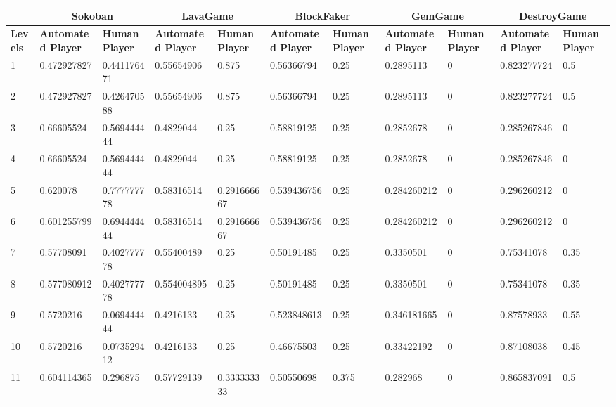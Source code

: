 \begin{landscape}
\begin{table}[!ht]
	\centering
	\begin{tabular}{|p{0.5in}|p{0.75in}|p{0.75in}|p{0.75in}|p{0.75in}|p{0.75in}|p{0.75in}|p{0.75in}|p{0.75in}|p{0.75in}|p{0.75in}|}
		\hline
		 & \multicolumn{2}{c}{\textbf{Sokoban}} & \multicolumn{2}{c}{\textbf{LavaGame}} & \multicolumn{2}{c}{\textbf{\textbf{BlockFaker}}} & \multicolumn{2}{c}{\textbf{GemGame}} & \multicolumn{2}{c}{\textbf{DestroyGame}}\\
		\hline
		\textbf{Levels} & \textbf{Automated Player} & \textbf{Human Player} & \textbf{Automated Player} & \textbf{Human Player} & \textbf{Automated Player} & \textbf{Human Player} & \textbf{Automated Player} & \textbf{Human Player} & \textbf{Automated Player} & \textbf{Human Player}\\
		\hline
		1 & 0.472927827 & 0.441176471 & 0.55654906 & 0.875 & 0.56366794 & 0.25 & 0.2895113 & 0 & 0.823277724 & 0.5\\
		\hline
		2 & 0.472927827 & 0.426470588 & 0.55654906 & 0.875 & 0.56366794 & 0.25 & 0.2895113 & 0 & 0.823277724 & 0.5\\
		\hline
		3 & 0.66605524 & 0.569444444 & 0.4829044 & 0.25 & 0.58819125 & 0.25 & 0.2852678 & 0 & 0.285267846 & 0\\
		\hline
		4 & 0.66605524 & 0.569444444 & 0.4829044 & 0.25 & 0.58819125 & 0.25 & 0.2852678 & 0 & 0.285267846 & 0\\
		\hline
		5 & 0.620078 & 0.777777778 & 0.58316514 & 0.291666667 & 0.539436756 & 0.25 & 0.284260212 & 0 & 0.296260212 & 0\\
		\hline
		6 & 0.601255799 & 0.694444444 & 0.58316514 & 0.291666667 & 0.539436756 & 0.25 & 0.284260212 & 0 & 0.296260212 & 0\\
		\hline
		7 & 0.57708091 & 0.402777778 & 0.55400489 & 0.25 & 0.50191485 & 0.25 & 0.3350501 & 0 & 0.75341078 & 0.35\\
		\hline
		8 & 0.577080912 & 0.402777778 & 0.554004895 & 0.25 & 0.50191485 & 0.25 & 0.3350501 & 0 & 0.75341078 & 0.35\\
		\hline
		9 & 0.5720216 & 0.069444444 & 0.4216133 & 0.25 & 0.523848613 & 0.25 & 0.346181665 & 0 & 0.87578933 & 0.55\\
		\hline
		10 & 0.5720216 & 0.073529412 & 0.4216133 & 0.25 & 0.46675503 & 0.25 & 0.33422192 & 0 & 0.87108038 & 0.45\\
		\hline
		11 & 0.604114365 & 0.296875 & 0.57729139 & 0.333333333 & 0.50550698 & 0.375 & 0.282968 & 0 & 0.865837091 & 0.5\\

\end{tabular}
\end{table}
\end{landscape}
